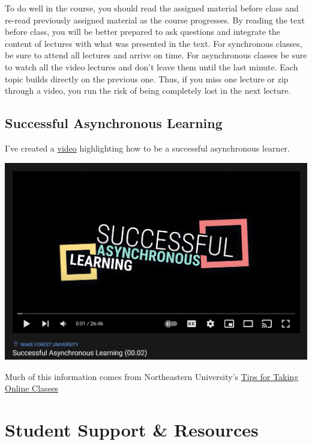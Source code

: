 To do well in the course, you should read the assigned material before class and re-read previously assigned material as the course progresses.
By reading the text before class, you will be better prepared to ask questions and integrate the content of lectures with what was presented in the text.
For synchronous classes, be sure to attend all lectures and arrive on time.
For asynchronous classes be sure to watch all the video lectures and don't leave them until the last minute. Each topic builds directly on the previous one.
Thus, if you miss one lecture or zip through a video, you run the risk of being completely lost in the next lecture.

\hypertarget{successful-asynchronous-learning}{%
\section{Successful Asynchronous Learning}\label{successful-asynchronous-learning}}

I've created a \href{https://youtu.be/dc3D2tbl8G0}{video} highlighting how to be a successful asynchronous learner.

\includegraphics[width=30.76in]{img/learngood}

Much of this information comes from Northeastern University's \href{https://www.northeastern.edu/graduate/blog/tips-for-taking-online-classes/}{Tips for Taking Online Classes}

\hypertarget{student-support-resources}{%
\chapter{Student Support \& Resources}\label{student-support-resources}}


